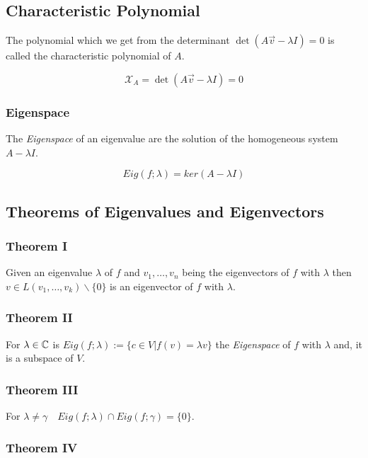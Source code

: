 \subsection{Characteristic Polynomial}

The polynomial which we get from the determinant \(\det (A\vec{v} - \lambda I)  = 0\) is called 
the characteristic polynomial of \(A\).

\[
    \mathcal{X}_A = \det (A\vec{v} - \lambda I) = 0
\]

\subsubsection{Eigenspace}

The \emph{Eigenspace} of an eigenvalue are the solution of the homogeneous system \(A - \lambda I\).

\[
    Eig(f;\lambda) = ker(A - \lambda I)
\]

\subsection{Theorems of Eigenvalues and Eigenvectors}

\subsubsection{Theorem I}

Given an eigenvalue \(\lambda\) of \(f\) and \(v_1, \dots, v_n\) being the eigenvectors of \(f\) 
with \(\lambda\) then \(v \in L(v_1, \dots, v_k) \backslash \{0\}\) is an eigenvector of 
\(f\) with \(\lambda\).

\subsubsection{Theorem II}

For \(\lambda \in \mathbb{C}\) is \(Eig(f;\lambda):= \{c \in V | f(v) = \lambda v\}\) the \emph{Eigenspace} of 
\(f\) with \(\lambda\) and, it is a subspace of \(V\).

\subsubsection{Theorem III}

For \(\lambda \ne \gamma \quad Eig(f;\lambda) \cap Eig(f;\gamma) = \{0\}\).

\subsubsection{Theorem IV}

